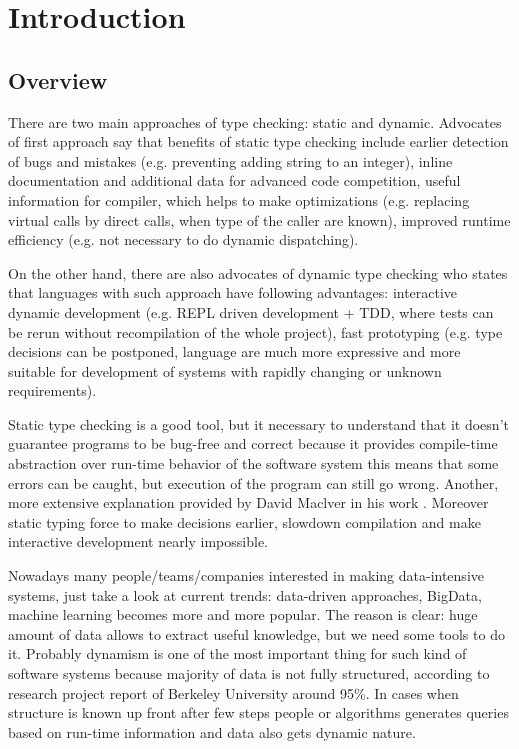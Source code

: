 \chapter{Introduction}
\label{chap:intro}

\section{Overview}

There are two main approaches of type checking: static and dynamic. Advocates of
first approach say that benefits of static type checking include earlier
detection of bugs and mistakes (e.g. preventing adding string to an integer),
inline documentation and additional data for advanced code competition, useful
information for compiler, which helps to make optimizations (e.g. replacing
virtual calls by direct calls, when type of the caller are known), improved
runtime efficiency (e.g. not necessary to do dynamic dispatching).

On the other hand, there are also advocates of dynamic type checking who states
that languages with such approach have following advantages: interactive dynamic
development (e.g. REPL driven development + TDD, where tests can be rerun
without recompilation of the whole project), fast prototyping (e.g. type
decisions can be postponed, language are much more expressive and more suitable
for development of systems with rapidly changing or unknown requirements).

Static type checking is a good tool, but it necessary to understand that it
doesn't guarantee programs to be bug-free and correct because it provides
compile-time abstraction over run-time behavior of the software system this
means that some errors can be caught, but execution of the program can still go
wrong. Another, more extensive explanation provided by David Maclver in his work
\cite{staticbroken}. Moreover static typing force to make decisions earlier,
slowdown compilation and make interactive development nearly impossible.

Nowadays many people/teams/companies interested in making data-intensive
systems, just take a look at current trends: data-driven approaches, BigData,
machine learning becomes more and more popular. The reason is clear: huge amount
of data allows to extract useful knowledge, but we need some tools to do it.
Probably dynamism is one of the most important thing for such kind of software
systems because majority of data is not fully structured, according to research
project report of Berkeley University \cite{lymanmuch} around 95\%. In cases when
structure is known up front after few steps people or algorithms generates
queries based on run-time information and data also gets dynamic nature.

